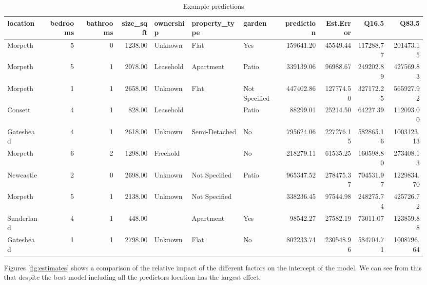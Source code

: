 \documentclass{scrartcl}
\begin{document}
\begin{landscape}
	\begin{table}[ht]
		\centering
		\caption{Example predictions} 
		\label{tab:pred}
		\begin{adjustbox}{max width=\linewidth}
		\begin{tabular}{lrrrlllrrrr}
			\hline
			location & bedrooms & bathrooms & size\_sqft & ownership & property\_type & garden & prediction & Est.Error & Q16.5 & Q83.5 \\ 
			\hline
			Morpeth &   5 &   0 & 1238.00 & Unknown & Flat & Yes & 159641.20 & 45549.44 & 117288.77 & 201473.15 \\ 
			Morpeth &   5 &   1 & 2078.00 & Leasehold & Apartment & Patio & 339139.06 & 96988.67 & 249202.89 & 427569.83 \\ 
			Morpeth &   1 &   1 & 2658.00 & Unknown & Flat & Not Specified & 447402.86 & 127774.50 & 327172.25 & 565927.92 \\ 
			Consett &   4 &   1 & 828.00 & Leasehold &  & Patio & 88299.01 & 25214.50 & 64227.39 & 112093.00 \\ 
			Gateshead &   4 &   1 & 2618.00 & Unknown & Semi-Detached & No & 795624.06 & 227276.15 & 582865.16 & 1003123.13 \\ 
			Morpeth &   6 &   2 & 1298.00 & Freehold &  & No & 218279.11 & 61535.25 & 160598.80 & 273408.13 \\ 
			Newcastle &   2 &   0 & 2698.00 & Unknown & Not Specified & Patio & 965347.52 & 278475.37 & 704531.97 & 1229834.70 \\ 
			Morpeth &   5 &   1 & 2138.00 & Unknown & Not Specified &  & 338236.45 & 97544.98 & 248275.74 & 425726.72 \\ 
			Sunderland &   4 &   1 & 448.00 &  & Apartment & Yes & 98542.27 & 27582.19 & 73011.07 & 123859.88 \\ 
			Gateshead &   1 &   1 & 2798.00 & Unknown & Flat & No & 802233.74 & 230548.96 & 584704.71 & 1008796.64 \\ 
			\hline
		\end{tabular}
	\end{adjustbox}
	\end{table}

\end{landscape}

Figures \ref{fig:estimates} shows a comparison of the relative impact of the different factors on the intercept of the model. We can see from this that despite the best model including all the predictors location has the largest effect. 
\end{document}
